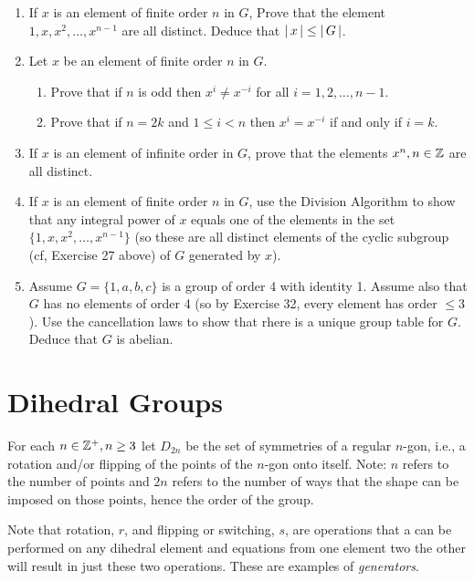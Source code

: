 \documentclass[10pt,a4paper]{report}
\begin{document}
\begin{enumerate}
	\item If $x$ is an element of finite order $n$ in $G$, Prove that the element $1, x,x^2,\dots, x^{n-1}$ are all distinct.  Deduce that $\left |\, x \,\right | \le \left |\, G \,\right |$.
	
	\item Let $x$ be an element of finite order $n$ in $G$.
	\begin{enumerate}
		\item Prove that if $n$ is odd then $x^i \ne x^{-i}$ for all $i=1,2,\dots,n-1$.
		
		\item Prove that if $n=2k$ and $1 \le i<n$ then $x^i=x^{-i}$ if and only if $i=k$.
	\end{enumerate}
	
	\item If $x$ is an element of infinite order in $G$, prove that the elements $x^n,n \in \mathbb{Z}$ are all distinct.
	
	\item If $x$ is an element of finite order $n$ in $G$, use the Division Algorithm to show that any integral power of $x$ equals one of the elements in the set $\{1,x,x^2,\dots,x^{n-1}\}$ (so these are all distinct elements of the cyclic subgroup (cf, Exercise 27 above) of $G$ generated by $x$).
	
	\item Assume $G=\{1,a,b,c\}$ is a group of order 4 with identity 1. Assume also that $G$ has no elements of order 4 (so by Exercise 32, every element has order $\le 3$).  Use the cancellation laws to show that rhere is a unique group table for $G$.  Deduce that $G$ is abelian.
	
\end{enumerate}

\section{Dihedral Groups}

\begin{definition} For each $n \in\mathbb{Z}^+, n \ge 3$  let $D_{2n}$ be the set of symmetries of a regular $n$-gon, i.e., a rotation and/or flipping of the points of the $n$-gon onto itself. Note: $n$ refers to the number of points and $2n$ refers to the number of ways that the shape can be imposed on those points, hence the order of the group.
\end{definition}

\begin{remark}Note that rotation, $r$, and flipping or switching, $s$, are operations that a can be performed on any dihedral element and equations from one element two the other will result in just these two operations.  These are examples of \textit{generators}.

\end{remark}
\end{document}
